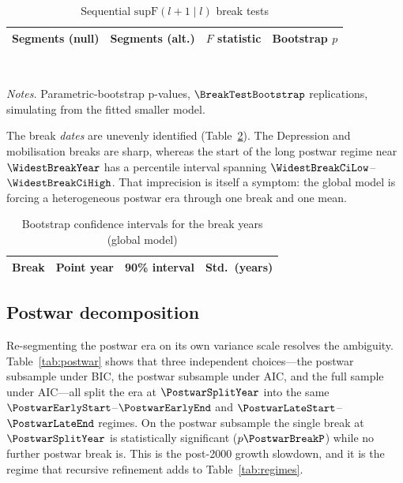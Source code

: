 \documentclass[11pt]{article}
\begin{document}
\begin{table}[H]
  \centering
  \caption{Sequential $\mathrm{supF}(l+1\mid l)$ break tests}
  \label{tab:breaktests}
  \begin{tabular}{rrrr}
    \toprule
    Segments (null) & Segments (alt.) & $F$ statistic & Bootstrap $p$ \\
    \midrule
    
  \end{tabular}
  \\[0.4em]
  {\footnotesize\begin{minipage}{0.72\linewidth}
  \textit{Notes.} Parametric-bootstrap p-values, $\BreakTestBootstrap$
  replications, simulating from the fitted smaller model.
  \end{minipage}}
\end{table}

The break \emph{dates} are unevenly identified (Table~\ref{tab:breakcis}). The
Depression and mobilisation breaks are sharp, whereas the start of the long
postwar regime near $\WidestBreakYear$ has a percentile interval spanning
$\WidestBreakCiLow$--$\WidestBreakCiHigh$. That imprecision is itself a symptom:
the global model is forcing a heterogeneous postwar era through one break and one
mean.

\begin{table}[H]
  \centering
  \caption{Bootstrap confidence intervals for the break years (global model)}
  \label{tab:breakcis}
  \begin{tabular}{rrcr}
    \toprule
    Break & Point year & 90\% interval & Std.\ (years) \\
    \midrule
    
  \end{tabular}
\end{table}

\subsection{Postwar decomposition}

Re-segmenting the postwar era on its own variance scale resolves the ambiguity.
Table~\ref{tab:postwar} shows that three independent choices---the postwar
subsample under BIC, the postwar subsample under AIC, and the full sample under
AIC---all split the era at $\PostwarSplitYear$ into the same
$\PostwarEarlyStart$--$\PostwarEarlyEnd$ and $\PostwarLateStart$--$\PostwarLateEnd$
regimes. On the postwar subsample the single break at $\PostwarSplitYear$ is
statistically significant ($p \PostwarBreakP$) while no further postwar break is.
This is the post-2000 growth slowdown, and it is the regime that recursive
refinement adds to Table~\ref{tab:regimes}.
\end{document}
